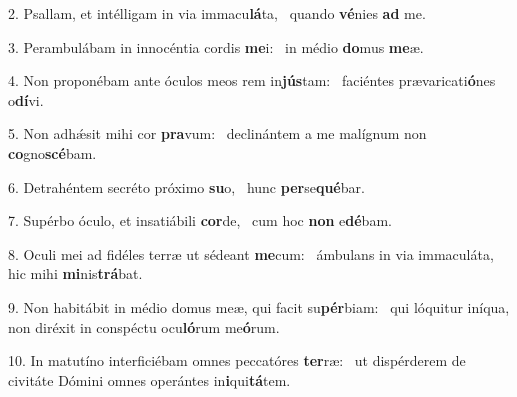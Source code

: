 2. Psallam, et intélligam in via immacu\textbf{lá}ta, \ast\  quando \textbf{vé}nies \textbf{ad} me.\

3. Perambulábam in innocéntia cordis \textbf{me}i: \ast\  in médio \textbf{do}mus \textbf{me}æ.\

4. Non proponébam ante óculos meos rem in\textbf{jús}tam: \ast\  faciéntes prævaricati\textbf{ó}nes o\textbf{dí}vi.\

5. Non adhǽsit mihi cor \textbf{pra}vum: \ast\  declinántem a me malígnum non \textbf{co}gno\textbf{scé}bam.\

6. Detrahéntem secréto próximo \textbf{su}o, \ast\  hunc \textbf{per}se\textbf{qué}bar.\

7. Supérbo óculo, et insatiábili \textbf{cor}de, \ast\  cum hoc \textbf{non} e\textbf{dé}bam.\

8. Oculi mei ad fidéles terræ ut sédeant \textbf{me}cum: \ast\  ámbulans in via immaculáta, hic mihi \textbf{mi}nis\textbf{trá}bat.\

9. Non habitábit in médio domus meæ, qui facit su\textbf{pér}biam: \ast\  qui lóquitur iníqua, non diréxit in conspéctu ocu\textbf{ló}rum me\textbf{ó}rum.\

10. In matutíno interficiébam omnes peccatóres \textbf{ter}ræ: \ast\  ut dispérderem de civitáte Dómini omnes operántes in\textbf{i}qui\textbf{tá}tem.\

